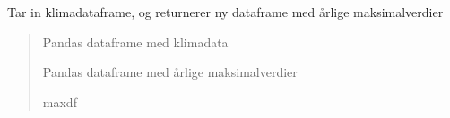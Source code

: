 \documentclass[letterpaper,10pt,norsk]{sphinxmanual}
\begin{document}

\begin{fulllineitems}
\label{\detokenize{index:klimadata.klimadata.maxdf}}
\pysigstartsignatures
{}
\pysigstopsignatures
\sphinxAtStartPar
Tar in klimadataframe, og returnerer ny dataframe med årlige maksimalverdier
\begin{quote}\begin{description}
\sphinxAtStartPar
{} \textendash{} Pandas dataframe med klimadata

\sphinxAtStartPar
Pandas dataframe med årlige maksimalverdier

\sphinxAtStartPar
maxdf

\end{description}\end{quote}

\end{fulllineitems}

\end{document}
